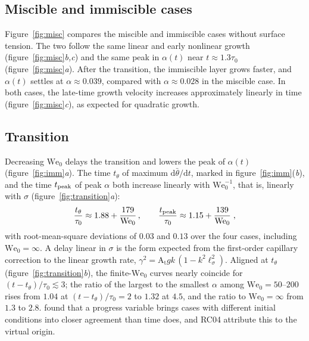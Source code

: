 \documentclass[11pt]{article}
\newcommand{\At}{\mathrm{A_t}}
\newcommand{\We}{\mathrm{We}_0}
\newcommand{\lls}{\ell_\sigma}
\begin{document}
\subsection{Miscible and immiscible cases}\label{sec:misc}

Figure~\ref{fig:misc} compares the miscible and immiscible cases without surface tension. The two follow the same linear and early nonlinear growth (figure~\ref{fig:misc}\textit{b,c}) and the same peak in $\alpha(t)$ near $t \approx 1.3 \tau_0$ (figure~\ref{fig:misc}\textit{a}). After the transition, the immiscible layer grows faster, and $\alpha(t)$ settles at $\alpha \approx 0.039$, compared with $\alpha \approx 0.028$ in the miscible case. In both cases, the late-time growth velocity increases approximately linearly in time (figure~\ref{fig:misc}\textit{c}), as expected for quadratic growth.

\subsection{Transition}\label{sec:transition}

Decreasing $\We$ delays the transition and lowers the peak of $\alpha(t)$ (figure~\ref{fig:imm}\textit{a}). The time $t_\theta$ of maximum $\mathrm d \bar\theta/\mathrm d t$, marked in figure~\ref{fig:imm}(\textit{b}), and the time $t_{\rm peak}$ of peak $\alpha$ both increase linearly with $\We^{-1}$, that is, linearly with $\sigma$ (figure~\ref{fig:transition}\textit{a}):
\begin{equation}
  \frac{t_\theta}{\tau_0} \approx 1.88 + \frac{179}{\We} \, , \qquad \frac{t_{\rm peak}}{\tau_0} \approx 1.15 + \frac{139}{\We} \;,
  \label{eq:t_transition}
\end{equation}
with root-mean-square deviations of $0.03$ and $0.13$ over the four cases, including $\We = \infty$. A delay linear in $\sigma$ is the form expected from the first-order capillary correction to the linear growth rate, $\gamma^2 = \At g k \,(1 - k^2 \lls^2)$. Aligned at $t_\theta$ (figure~\ref{fig:transition}\textit{b}), the finite-$\We$ curves nearly coincide for $(t - t_\theta)/\tau_0 \lesssim 3$; the ratio of the largest to the smallest $\alpha$ among $\We = 50$--$200$ rises from $1.04$ at $(t - t_\theta)/\tau_0 = 2$ to $1.32$ at $4.5$, and the ratio to $\We = \infty$ from $1.3$ to $2.8$. \citet{Cook2001} found that a progress variable brings cases with different initial conditions into closer agreement than time does, and RC04 attribute this to the virtual origin.
\end{document}
